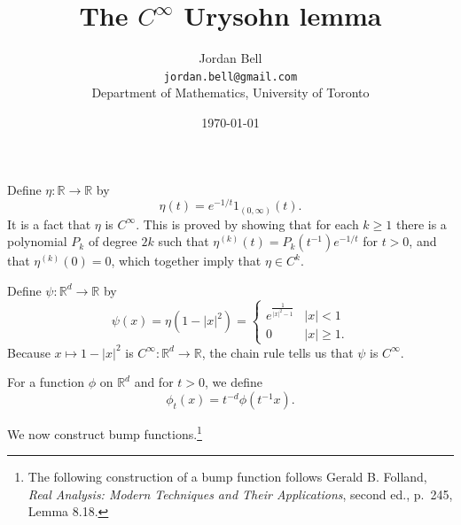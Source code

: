 \documentclass{article}
\theoremstyle{definition}
\begin{document}
\title{The $C^\infty$ Urysohn lemma}
\author{Jordan Bell\\ \texttt{jordan.bell@gmail.com}\\Department of Mathematics, University of Toronto}
\date{\today}

\maketitle

Define $\eta:\mathbb{R} \to \mathbb{R}$ by
\[
\eta(t) = e^{-1/t} 1_{(0,\infty)}(t).
\]
It is a fact that $\eta$ is $C^\infty$. This is proved by showing that for each $k \geq 1$ there is a polynomial $P_k$ of degree $2k$ such that $\eta^{(k)}(t)=P_k(t^{-1}) e^{-1/t}$ for
$t>0$, and that $\eta^{(k)}(0)=0$, which together imply that $\eta \in C^k$.


Define $\psi:\mathbb{R}^d \to \mathbb{R}$ by
\[
\psi(x) = \eta(1-|x|^2) = \begin{cases}
e^{\frac{1}{|x|^2-1}}&|x|<1\\
0&|x| \geq 1.
\end{cases}
\]
Because $x \mapsto 1-|x|^2$ is $C^\infty:\mathbb{R}^d \to \mathbb{R}$,  the chain rule tells us that
$\psi$ is $C^\infty$. 

For a function $\phi$ on $\mathbb{R}^d$ and for $t>0$, we define
\[
\phi_t(x) = t^{-d} \phi(t^{-1}x).
\]

We now construct bump functions.\footnote{The following construction of a bump function 
follows  Gerald B. Folland, {\em Real Analysis: Modern Techniques
and Their Applications}, second ed., p.~245, Lemma 8.18.}
\end{document}
